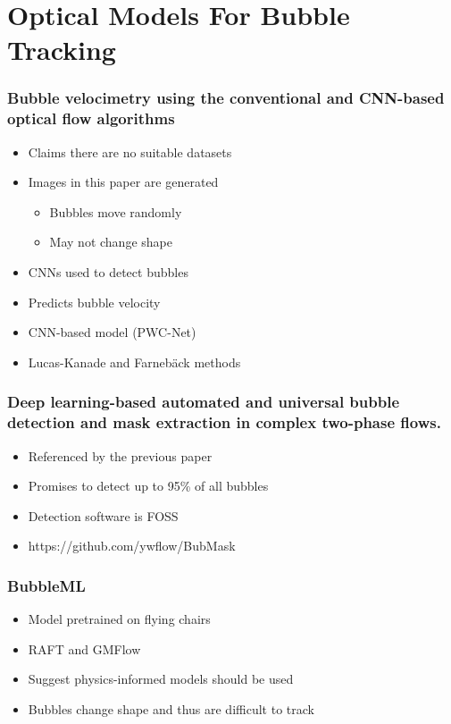 \documentclass{beamer}
\begin{document}
\section {Optical Models For Bubble Tracking}

\begin{frame}
    \frametitle{Bubble velocimetry using the conventional and CNN-based optical flow algorithms}
    \begin{itemize}
        \item Claims there are no suitable datasets
        \item Images in this paper are generated
            \begin{itemize}
                \item Bubbles move randomly
                \item May not change shape
            \end{itemize}
        \item CNNs used to detect bubbles
        \item Predicts bubble velocity
        \item CNN-based model (PWC-Net)
        \item Lucas-Kanade and Farnebäck methods
    \end{itemize}
\end{frame}

\begin{frame}
    \frametitle{Deep learning-based automated and universal bubble detection and mask extraction in complex two-phase flows.}
    \begin{itemize}
        \item Referenced by the previous paper
        \item Promises to detect up to 95\% of all bubbles
        \item Detection software is FOSS
        \item https://github.com/ywflow/BubMask
    \end{itemize}
\end{frame}

\begin{frame}
    \frametitle{BubbleML}
    \begin{itemize}
        \item Model pretrained on flying chairs
        \item RAFT and GMFlow
        \item Suggest physics-informed models should be used
        \item Bubbles change shape and thus are difficult to track
    \end{itemize}
\end{frame}
\end{document}
